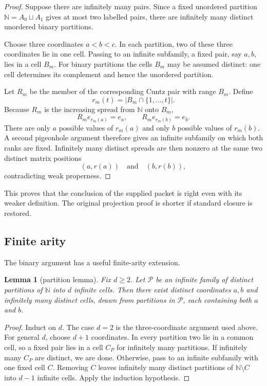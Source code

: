 \documentclass[11pt]{article}
\newtheorem{lemma}[theorem]{Lemma}
\theoremstyle{definition}
\theoremstyle{remark}
\newcommand{\N}{\mathbb N}
\begin{document}
\begin{proof}
Suppose there are infinitely many pairs.  Since a fixed unordered partition
$\N=A_0\sqcup A_1$ gives at most two labelled pairs, there are infinitely many
distinct unordered binary partitions.

Choose three coordinates $a<b<c$.  In each partition, two of these three
coordinates lie in one cell.  Passing to an infinite subfamily, a fixed pair,
say $a,b$, lies in a cell $B_m$.  For binary partitions the cells $B_m$ may be
assumed distinct: one cell determines its complement and hence the unordered
partition.

Let $R_m$ be the member of the corresponding Cuntz pair with range $B_m$.
Define
\[
 r_m(t)=|B_m\cap\{1,\dots,t\}|.
\]
Because $R_m$ is the increasing spread from $\N$ onto $B_m$,
\[
 R_m e_{r_m(a)}=e_a,
 \qquad
 R_m e_{r_m(b)}=e_b.
\]
There are only $a$ possible values of $r_m(a)$ and only $b$ possible values of
$r_m(b)$.  A second pigeonhole argument therefore gives an infinite subfamily
on which both ranks are fixed.  Infinitely many distinct spreads are then
nonzero at the same two distinct matrix positions
\[
 (a,r(a))\quad\text{and}\quad(b,r(b)),
\]
contradicting weak properness.
\end{proof}

This proves that the conclusion of the supplied packet is right even with its
weaker definition.  The original projection proof is shorter if standard
closure is restored.

\subsection{Finite arity}

The binary argument has a useful finite-arity extension.

\begin{lemma}[partition lemma]\label{lem:partition}
Fix $d\ge2$.  Let $\mathscr P$ be an infinite family of distinct partitions of
$\N$ into $d$ infinite cells.  Then there exist distinct coordinates $a,b$ and
infinitely many distinct cells, drawn from partitions in $\mathscr P$, each
containing both $a$ and $b$.
\end{lemma}

\begin{proof}
Induct on $d$.  The case $d=2$ is the three-coordinate argument used above.
For general $d$, choose $d+1$ coordinates.  In every partition two lie in a
common cell, so a fixed pair lies in a cell $C_P$ for infinitely many
partitions.  If infinitely many $C_P$ are distinct, we are done.  Otherwise,
pass to an infinite subfamily with one fixed cell $C$.  Removing $C$ leaves
infinitely many distinct partitions of $\N\setminus C$ into $d-1$ infinite
cells.  Apply the induction hypothesis.
\end{proof}
\end{document}
